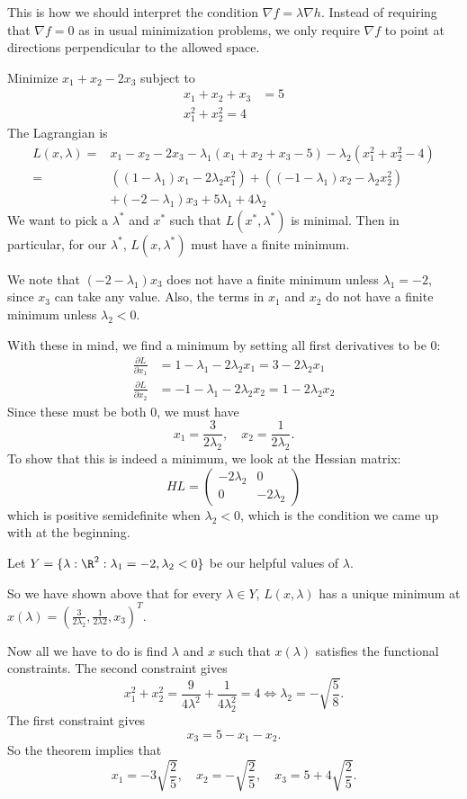 \documentclass[a4paper]{article}
\begin{document}
This is how we should interpret the condition $\nabla f = \lambda \nabla h$. Instead of requiring that $\nabla f = 0$ as in usual minimization problems, we only require $\nabla f$ to point at directions perpendicular to the allowed space.

\begin{eg}
  Minimize $x_1 + x_2 - 2x_3$ subject to
  \begin{align*}
    x_1 + x_2 + x_3 &= 5\\
    x_1^2 + x_2^2 = 4
  \end{align*}
  The Lagrangian is
  \begin{align*}
    L(x, \lambda) ={}& x_1 - x_2 - 2x_3 - \lambda_1(x_1 + x_2 + x_3 - 5) - \lambda_2 (x_1^2 + x_2^2 - 4)\\
    ={}& ((1 - \lambda_1)x_1 - 2\lambda_2 x_1^2) + ((-1 - \lambda_1)x_2 - \lambda_2 x_2^2) \\
    &+ (-2 - \lambda_1)x_3 + 5\lambda_1 + 4\lambda_2
  \end{align*}
  We want to pick a $\lambda^*$ and $x^*$ such that $L(x^*, \lambda^*)$ is minimal. Then in particular, for our $\lambda^*$, $L(x, \lambda^*)$ must have a finite minimum.

  We note that $(-2 - \lambda_1)x_3$ does not have a finite minimum unless $\lambda_1 = -2$, since $x_3$ can take any value. Also, the terms in $x_1$ and $x_2$ do not have a finite minimum unless $\lambda_2 < 0$.

  With these in mind, we find a minimum by setting all first derivatives to be $0$:
  \begin{align*}
    \frac{\partial L}{\partial x_1} &= 1 - \lambda_1 - 2\lambda_2 x_1 = 3 - 2\lambda_2x_1\\
    \frac{\partial L}{\partial x_2} &= -1 - \lambda_1 - 2\lambda_2 x_2 = 1 - 2\lambda_2 x_2
  \end{align*}
  Since these must be both $0$, we must have
  \[
    x_1 = \frac{3}{2\lambda_2}, \quad x_2 = \frac{1}{2\lambda_2}.
  \]
  To show that this is indeed a minimum, we look at the Hessian matrix:
  \[
    HL =
    \begin{pmatrix}
      -2\lambda_2 & 0\\
      0 & -2\lambda_2
    \end{pmatrix}
  \]
  which is positive semidefinite when $\lambda_2 < 0$, which is the condition we came up with at the beginning.

  Let $Y = \{\lambda: \R^2: \lambda_1 = -2, \lambda_2 < 0\}$ be our helpful values of $\lambda$.

  So we have shown above that for every $\lambda \in Y$, $L(x, \lambda)$ has a unique minimum at $x(\lambda) = (\frac{3}{2\lambda_2}, \frac{1}{2\lambda2}, x_3)^T$.

  Now all we have to do is find $\lambda$ and $x$ such that $x(\lambda)$ satisfies the functional constraints. The second constraint gives
  \[
    x_1^2 + x_2^2 = \frac{9}{4\lambda^2} + \frac{1}{4\lambda_2^2} = 4 \Leftrightarrow \lambda_2 = -\sqrt{\frac{5}{8}}.
  \]
  The first constraint gives
  \[
    x_3 = 5 - x_1 - x_2.
  \]
  So the theorem implies that
  \[
    x_1 = -3\sqrt{\frac{2}{5}},\quad x_2 = -\sqrt{\frac{2}{5}},\quad x_3 = 5 + 4\sqrt{\frac{2}{5}}.
  \]
\end{eg}
\end{document}
